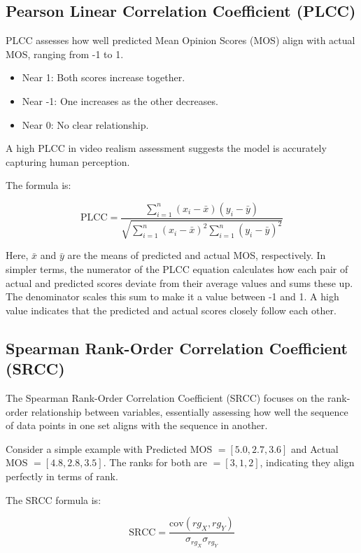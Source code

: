 \documentclass[a4paper,12pt,openright]{book}
\begin{document}
\subsection{Pearson Linear Correlation Coefficient (PLCC)}

PLCC assesses how well predicted Mean Opinion Scores (MOS) align with actual MOS, ranging from -1 to 1.

\begin{itemize}
    \item Near 1: Both scores increase together.
    \item Near -1: One increases as the other decreases.
    \item Near 0: No clear relationship.
\end{itemize}

A high PLCC in video realism assessment suggests the model is accurately capturing human perception.

The formula is:

\[
\text{PLCC} = \frac{\sum_{i=1}^{n}{(x_i - \bar{x})(y_i - \bar{y})}}{\sqrt{\sum_{i=1}^{n}{(x_i - \bar{x})^2} \sum_{i=1}^{n}{(y_i - \bar{y})^2}}}
\]

Here, \( \bar{x} \) and \( \bar{y} \) are the means of predicted and actual MOS, respectively.
In simpler terms, the numerator of the PLCC equation calculates how each pair of actual and predicted scores deviate from their average values and sums these up. The denominator scales this sum to make it a value between -1 and 1. A high value indicates that the predicted and actual scores closely follow each other.

\subsection{Spearman Rank-Order Correlation Coefficient (SRCC)}

The Spearman Rank-Order Correlation Coefficient (SRCC) focuses on the rank-order relationship between variables, essentially assessing how well the sequence of data points in one set aligns with the sequence in another. 

Consider a simple example with Predicted MOS \(= [5.0, 2.7, 3.6]\) and Actual MOS \(= [4.8, 2.8, 3.5]\). The ranks for both are \(= [3, 1, 2]\), indicating they align perfectly in terms of rank.

The SRCC formula is:

\[
\text{SRCC} = \frac{\text{cov}(rg_X, rg_Y)}{\sigma_{rg_X} \sigma_{rg_Y}}
\]
\end{document}
